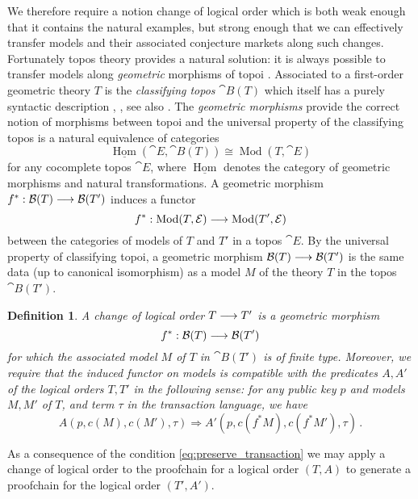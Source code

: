 \documentclass[english,letter paper,12pt,reqno]{article}
\theoremstyle{example}
\newtheorem{definition}[theorem]{Definition}
\DeclareMathOperator{\Mod}{Mod}
\begin{document}
We therefore require a notion change of logical order which is both weak enough that it contains the natural examples, but strong enough that we can effectively transfer models and their associated conjecture markets along such changes. Fortunately topos theory provides a natural solution: it is always possible to transfer models along \emph{geometric} morphisms of topoi \cite[Corollary \S X.6]{topos}. Associated to a first-order geometric theory $T$ is the \emph{classifying topos} $\cat{B}(T)$ which itself has a purely syntactic description \cite[\S D1.4]{johnstone}, \cite[Lecture 15]{risingseminar}, see also \cite[\S X.5]{topos}. The \emph{geometric morphisms} \cite[Ch. VII]{topos} provide the correct notion of morphisms between topoi and the universal property of the classifying topos \cite[\S VIII.3]{topos} is a natural equivalence of categories
\[
\underline{\operatorname{Hom}}( \cat{E}, \cat{B}(T) ) \cong \Mod(T, \cat{E})
\]
for any cocomplete topos $\cat{E}$, where $\underline{\operatorname{Hom}}$ denotes the category of geometric morphisms and natural transformations. A geometric morphism $f^*: \mathcal{B}(T) \longrightarrow \mathcal{B}(T')$ induces a functor
\[
f^*: \Mod(T, \cat{E}) \lto \Mod(T', \cat{E})
\]
between the categories of models of $T$ and $T'$ in a topos $\cat{E}$. By the universal property of classifying topoi, a geometric morphism $\mathcal{B}(T) \longrightarrow \mathcal{B}(T')$ is the same data (up to canonical isomorphism) as a model $M$ of the theory $T$ in the topos $\cat{B}(T')$. %

\begin{definition}\label{definition:change_of_order} A \emph{change of logical order} $T \longrightarrow T'$ is a geometric morphism
\[
f^*: \mathcal{B}(T) \longrightarrow \mathcal{B}(T')
\]
for which the associated model $M$ of $T$ in $\cat{B}(T')$ is of finite type. Moreover, we require that the induced functor on models is compatible with the predicates $A, A'$ of the logical orders $T,T'$ in the following sense: for any public key $p$ and models $M, M'$ of $T$, and term $\tau$ in the transaction language, we have
\begin{equation}\label{eq:preserve_transaction}
A(p, c(M), c(M'), \tau) \Longrightarrow A'(p, c(f^*M), c(f^*M'), \tau)\,.
\end{equation}
\end{definition}

As a consequence of the condition \eqref{eq:preserve_transaction} we may apply a change of logical order to the proofchain for a logical order $(T,A)$ to generate a proofchain for the logical order $(T',A')$.
\end{document}
